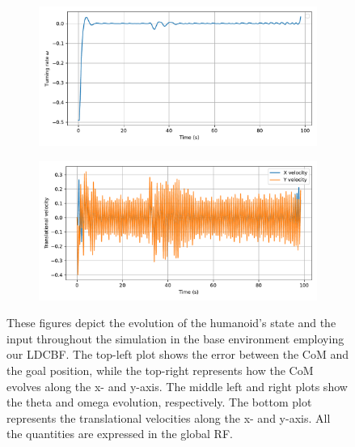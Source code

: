 \begin{figure}[H]
\begin{subfigure}{0.45\linewidth}
    \end{subfigure}
    \begin{subfigure}{0.45\linewidth}
        \centering
        \includegraphics[width=\linewidth]{figures/Simulations/sim1circles/evolution_3.pdf}
    \end{subfigure}
    \hfill
    \begin{subfigure}{0.45\linewidth}
        \centering
        \includegraphics[width=\linewidth]{figures/Simulations/sim1circles/evolution_1.pdf}
    \end{subfigure}
    \caption{These figures depict the evolution of the humanoid's state and the input throughout the simulation in the base environment employing our LDCBF. The top-left plot shows the error between the CoM and the goal position, while the top-right represents how the CoM evolves along the x- and y-axis. The middle left and right plots show the theta and omega evolution, respectively. The bottom plot represents the translational velocities along the x- and y-axis. All the quantities are expressed in the global RF.}
    \label{fig:sim1_evol}
\end{figure}


